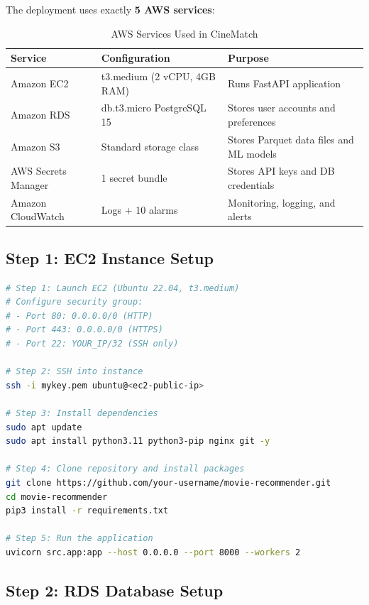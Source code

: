 \documentclass[12pt,a4paper]{report}
\begin{document}
The deployment uses exactly \textbf{5 AWS services}:

\begin{table}[H]
\centering
\caption{AWS Services Used in CineMatch}
\begin{tabular}{|p{3cm}|p{4cm}|p{5cm}|}
\hline
\textbf{Service} & \textbf{Configuration} & \textbf{Purpose} \\
\hline
Amazon EC2 & t3.medium (2 vCPU, 4GB RAM) & Runs FastAPI application \\
\hline
Amazon RDS & db.t3.micro PostgreSQL 15 & Stores user accounts and preferences \\
\hline
Amazon S3 & Standard storage class & Stores Parquet data files and ML models \\
\hline
AWS Secrets Manager & 1 secret bundle & Stores API keys and DB credentials \\
\hline
Amazon CloudWatch & Logs + 10 alarms & Monitoring, logging, and alerts \\
\hline
\end{tabular}
\end{table}

\subsection{Step 1: EC2 Instance Setup}

\begin{lstlisting}[language=bash, caption={EC2 Instance Configuration and Deployment}]
# Step 1: Launch EC2 (Ubuntu 22.04, t3.medium)
# Configure security group:
# - Port 80: 0.0.0.0/0 (HTTP)
# - Port 443: 0.0.0.0/0 (HTTPS)
# - Port 22: YOUR_IP/32 (SSH only)

# Step 2: SSH into instance
ssh -i mykey.pem ubuntu@<ec2-public-ip>

# Step 3: Install dependencies
sudo apt update
sudo apt install python3.11 python3-pip nginx git -y

# Step 4: Clone repository and install packages
git clone https://github.com/your-username/movie-recommender.git
cd movie-recommender
pip3 install -r requirements.txt

# Step 5: Run the application
uvicorn src.app:app --host 0.0.0.0 --port 8000 --workers 2
\end{lstlisting}

\subsection{Step 2: RDS Database Setup}
\end{document}
